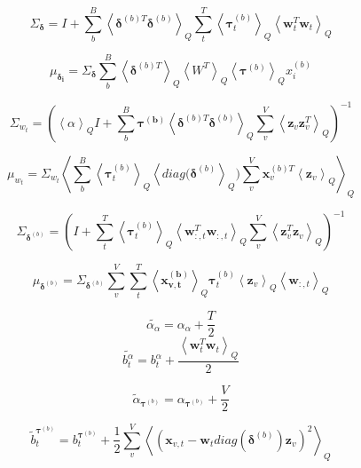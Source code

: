 \documentclass[10pt]{article}
\newcommand{\Angle}[1]{\left \langle #1 \right \rangle}
\newcommand{\Eq}[1]{\Angle{#1}_Q}
\begin{document}
    \begin{equation}
        \Sigma_{\bm{\delta}} = I + \sum_b^B
        \Eq{\bm{\delta}^{(b)T}\bm{\delta}^{(b)}}\sum_t^T\Eq{\bm{\tau}_t^{(b)}}\Eq{\bm{w}_t^T\bm{w}_t}
    \end{equation}

    \begin{equation}
        \mu_{\bm{\delta_i}} = \Sigma_{\bm{\delta}}\sum_b^B\Eq{\bm{\delta}^{(b)T}}\Eq{W^T}\Eq{\bm{\tau}^{(b)}}x^{(b)}_i
    \end{equation}

    \begin{equation}
        \Sigma_{w_t} = (\Eq{\alpha}I + \sum_b^B\bm{\tau^{(b)}}\Eq{\bm{\delta}^{(b)T}\bm{\delta}^{(b)}}\sum_v^V\Eq{\bm{z}_v\bm{z}_v^T})^{-1}
    \end{equation}

    \begin{equation}
        \mu_{w_t} = \Sigma_{w_t}\Eq{\sum_b^B\Eq{\bm{\tau}_t^{(b)}}\Eq{diag(\bm{\delta}^{(b)}})\sum_v^V \bm{x}_v^{(b)T}\Eq{\bm{z}_v} }
    \end{equation}

    \begin{equation}
        \Sigma_{\bm{\delta}^{(b)}} = (I + \sum_t^T\Eq{\bm{\tau}_t^{(b)}}\Eq{\bm{w}_{:,t}^T\bm{w}_{:,t}}\sum_v^V\Eq{\bm{z}_v^T\bm{z}_v})^{-1}
    \end{equation}

    \begin{equation}
        \mu_{\bm{\delta}^{(b)}}=\Sigma_{\bm{\delta}^{(b)}}\sum_v^V\sum_t^T\Eq{\bm{x_{v,t}^{(b)}}}\bm{\tau}^{(b)}_t\Eq{\bm{z}_v}\Eq{\bm{w}_{:,t}}
    \end{equation}

    \begin{equation}
        \tilde{\alpha_{\alpha}} = \alpha_{\alpha} + \frac{T}{2}
    \end{equation}
    \begin{equation}
        \tilde{b^{\alpha}_t} = b^{\alpha}_t + \frac{\Eq{\bm{w}_t^T\bm{w}_t}}{2}
    \end{equation}

    \begin{equation}
        \tilde{\alpha}_{\bm{\tau}^{(b)}} = \alpha_{\bm{\tau}^{(b)}} + \frac{V}{2}
    \end{equation}

    \begin{equation}
        \tilde{b}_t^{\bm{\tau}^{(b)}} = b_t^{\bm{\tau}^{(b)}} + \frac{1}{2}\sum_v^V\Eq{(\bm{x}_{v,t} - \bm{w}_tdiag(\bm{\delta}^{(b)})\bm{z}_v)^2}
    \end{equation}
\end{document}
